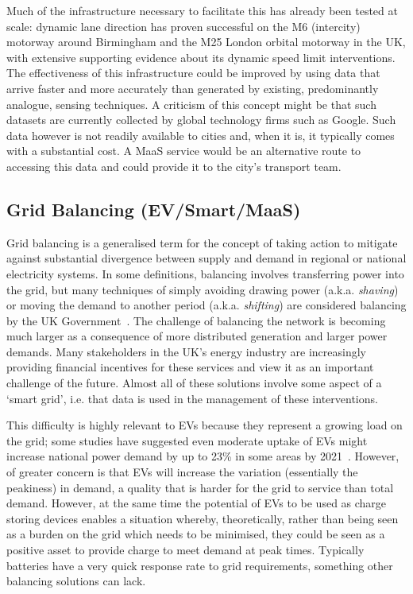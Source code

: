 \documentclass[b5paper,10pt]{article}
\begin{document}
Much of the infrastructure necessary to facilitate this has already
been tested at scale: dynamic lane direction has proven successful on
the M6 (intercity) motorway around Birmingham and the M25 London
orbital motorway in the UK, with extensive supporting evidence about
its dynamic speed limit interventions. The effectiveness of this
infrastructure could be improved by using data that arrive faster and
more accurately than generated by existing, predominantly analogue,
sensing techniques.  A criticism of this concept might be that such
datasets are currently collected by global technology firms such as
Google. Such data however is not readily available to cities and, when
it is, it typically comes with a substantial cost. A MaaS service
would be an alternative route to accessing this data and could provide
it to the city's transport team.

\subsection{Grid Balancing (EV/Smart/MaaS)} 

Grid balancing is a generalised term for the concept of taking action
to mitigate against substantial divergence between supply and demand
in regional or national electricity systems. In some definitions,
balancing involves transferring power into the grid, but many
techniques of simply avoiding drawing power (a.k.a. {\emph{shaving}})
or moving the demand to another period (a.k.a. {\emph{shifting}}) are
considered balancing by the UK Government~\citep{decc:2014}. The
challenge of balancing the network is becoming much larger as a
consequence of more distributed generation and larger power
demands. Many stakeholders in the UK's energy industry are
increasingly providing financial incentives for these services and
view it as an important challenge of the future. Almost all of these
solutions involve some aspect of a `smart grid', i.e. that data is
used in the management of these interventions.

This difficulty is highly relevant to EVs because they represent a
growing load on the grid; some studies have suggested even moderate
uptake of EVs might increase national power demand by up to 23\% in
some areas by 2021~\citep{paffumi-et-al:2015}. However, of greater
concern is that EVs will increase the variation
(essentially the peakiness) in demand, a quality that is harder for
the grid to service than total demand. However, at the same time the
potential of EVs to be used as charge storing devices enables a
situation whereby, theoretically, rather than being seen as a burden
on the grid which needs to be minimised, they could be seen as a
positive asset to provide charge to meet demand at peak
times. Typically batteries have a very quick response rate to grid
requirements, something other balancing solutions can lack.
\end{document}
